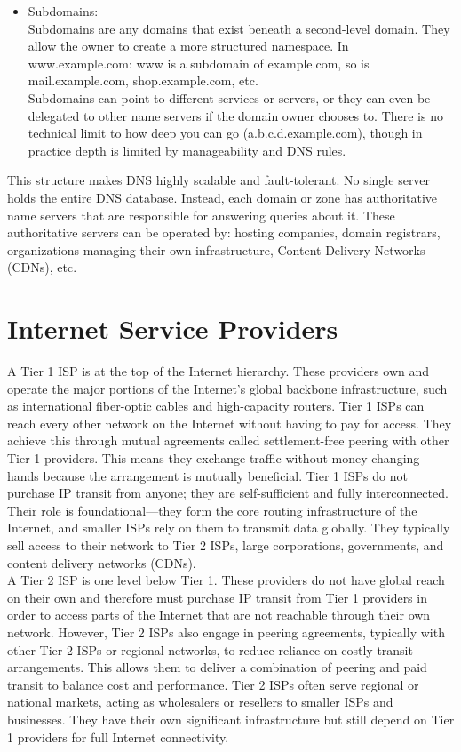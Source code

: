 \documentclass{article}
\begin{document}
\begin{itemize}
		\item Subdomains:\\
			Subdomains are any domains that exist beneath a second-level domain. They allow the owner to create a more structured namespace. In www.example.com: www is a subdomain of example.com, so is mail.example.com, shop.example.com, etc.\\

			Subdomains can point to different services or servers, or they can even be delegated to other name servers if the domain owner chooses to. There is no technical limit to how deep you can go (a.b.c.d.example.com), though in practice depth is limited by manageability and DNS rules.
	\end{itemize}

This structure makes DNS highly scalable and fault-tolerant. No single server holds the entire DNS database. Instead, each domain or zone has authoritative name servers that are responsible for answering queries about it. These authoritative servers can be operated by: hosting companies, domain registrars, organizations managing their own infrastructure, Content Delivery Networks (CDNs), etc.

\section*{Internet Service Providers}
A Tier 1 ISP is at the top of the Internet hierarchy. These providers own and operate the major portions of the Internet's global backbone infrastructure, such as international fiber-optic cables and high-capacity routers. Tier 1 ISPs can reach every other network on the Internet without having to pay for access. They achieve this through mutual agreements called settlement-free peering with other Tier 1 providers. This means they exchange traffic without money changing hands because the arrangement is mutually beneficial. Tier 1 ISPs do not purchase IP transit from anyone; they are self-sufficient and fully interconnected. Their role is foundational—they form the core routing infrastructure of the Internet, and smaller ISPs rely on them to transmit data globally. They typically sell access to their network to Tier 2 ISPs, large corporations, governments, and content delivery networks (CDNs).\\

A Tier 2 ISP is one level below Tier 1. These providers do not have global reach on their own and therefore must purchase IP transit from Tier 1 providers in order to access parts of the Internet that are not reachable through their own network. However, Tier 2 ISPs also engage in peering agreements, typically with other Tier 2 ISPs or regional networks, to reduce reliance on costly transit arrangements. This allows them to deliver a combination of peering and paid transit to balance cost and performance. Tier 2 ISPs often serve regional or national markets, acting as wholesalers or resellers to smaller ISPs and businesses. They have their own significant infrastructure but still depend on Tier 1 providers for full Internet connectivity.\\
\end{document}
